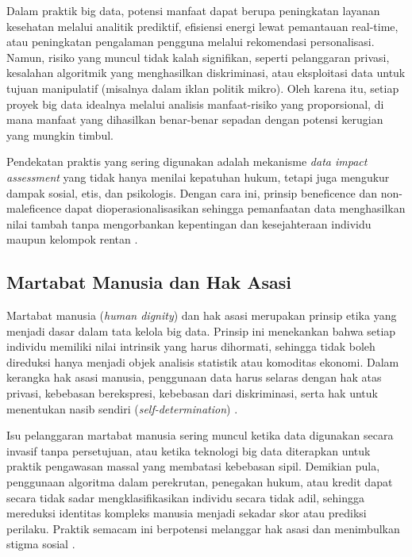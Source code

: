 Dalam praktik big data, potensi manfaat dapat berupa peningkatan layanan kesehatan melalui analitik prediktif, efisiensi energi lewat pemantauan real-time, atau peningkatan pengalaman pengguna melalui rekomendasi personalisasi. Namun, risiko yang muncul tidak kalah signifikan, seperti pelanggaran privasi, kesalahan algoritmik yang menghasilkan diskriminasi, atau eksploitasi data untuk tujuan manipulatif (misalnya dalam iklan politik mikro). Oleh karena itu, setiap proyek big data idealnya melalui analisis manfaat-risiko yang proporsional, di mana manfaat yang dihasilkan benar-benar sepadan dengan potensi kerugian yang mungkin timbul.  

Pendekatan praktis yang sering digunakan adalah mekanisme \textit{data impact assessment} yang tidak hanya menilai kepatuhan hukum, tetapi juga mengukur dampak sosial, etis, dan psikologis. Dengan cara ini, prinsip beneficence dan non-maleficence dapat dioperasionalisasikan sehingga pemanfaatan data menghasilkan nilai tambah tanpa mengorbankan kepentingan dan kesejahteraan individu maupun kelompok rentan \cite{floridi2018softethics}.

\subsection{Martabat Manusia dan Hak Asasi}

Martabat manusia (\textit{human dignity}) dan hak asasi merupakan prinsip etika yang menjadi dasar dalam tata kelola big data. Prinsip ini menekankan bahwa setiap individu memiliki nilai intrinsik yang harus dihormati, sehingga tidak boleh direduksi hanya menjadi objek analisis statistik atau komoditas ekonomi. Dalam kerangka hak asasi manusia, penggunaan data harus selaras dengan hak atas privasi, kebebasan berekspresi, kebebasan dari diskriminasi, serta hak untuk menentukan nasib sendiri (\textit{self-determination}) \cite{unitednations1948}.  

Isu pelanggaran martabat manusia sering muncul ketika data digunakan secara invasif tanpa persetujuan, atau ketika teknologi big data diterapkan untuk praktik pengawasan massal yang membatasi kebebasan sipil. Demikian pula, penggunaan algoritma dalam perekrutan, penegakan hukum, atau kredit dapat secara tidak sadar mengklasifikasikan individu secara tidak adil, sehingga mereduksi identitas kompleks manusia menjadi sekadar skor atau prediksi perilaku. Praktik semacam ini berpotensi melanggar hak asasi dan menimbulkan stigma sosial \cite{boyd2012critical}.  

